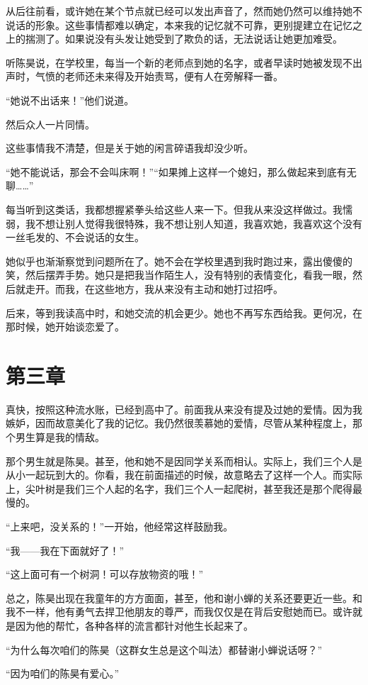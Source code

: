 \documentclass[lang=cn]{elegantpaper}
\begin{document}
从后往前看，或许她在某个节点就已经可以发出声音了，然而她仍然可以维持她不说话的形象。这些事情都难以确定，本来我的记忆就不可靠，更别提建立在记忆之上的揣测了。如果说没有头发让她受到了欺负的话，无法说话让她更加难受。

听陈昊说，在学校里，每当一个新的老师点到她的名字，或者早读时她被发现不出声时，气愤的老师还未来得及开始责骂，便有人在旁解释一番。

“她说不出话来！”他们说道。

然后众人一片同情。

这些事情我不清楚，但是关于她的闲言碎语我却没少听。

“她不能说话，那会不会叫床啊！”“如果摊上这样一个媳妇，那么做起来到底有无聊……”

每当听到这类话，我都想握紧拳头给这些人来一下。但我从来没这样做过。我懦弱，我不想让别人觉得我很特殊，我不想让别人知道，我喜欢她，我喜欢这个没有一丝毛发的、不会说话的女生。

她似乎也渐渐察觉到问题所在了。她不会在学校里遇到我时跑过来，露出傻傻的笑，然后摆弄手势。她只是把我当作陌生人，没有特别的表情变化，看我一眼，然后就走开。而我，在这些地方，我从来没有主动和她打过招呼。

后来，等到我读高中时，和她交流的机会更少。她也不再写东西给我。更何况，在那时候，她开始谈恋爱了。
\section{第三章}
\label{sec:org8d78f39}

真快，按照这种流水账，已经到高中了。前面我从来没有提及过她的爱情。因为我嫉妒，因而故意美化了我的记忆。我仍然很羡慕她的爱情，尽管从某种程度上，那个男生算是我的情敌。

那个男生就是陈昊。甚至，他和她不是因同学关系而相认。实际上，我们三个人是从小一起玩到大的。你看，我在前面描述的时候，故意略去了这样一个人。而实际上，尖叶树是我们三个人起的名字，我们三个人一起爬树，甚至我还是那个爬得最慢的。

“上来吧，没关系的！”一开始，他经常这样鼓励我。

“我——我在下面就好了！”

“这上面可有一个树洞！可以存放物资的哦！”

总之，陈昊出现在我童年的方方面面，甚至，他和谢小蝉的关系还要更近一些。和我不一样，他有勇气去捍卫他朋友的尊严，而我仅仅是在背后安慰她而已。或许就是因为他的帮忙，各种各样的流言都针对他生长起来了。

“为什么每次咱们的陈昊（这群女生总是这个叫法）都替谢小蝉说话呀？”

“因为咱们的陈昊有爱心。”
\end{document}
